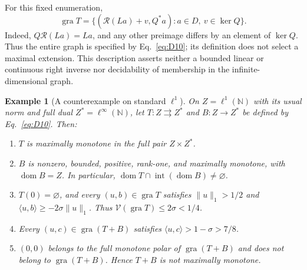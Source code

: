 \documentclass[11pt]{article}
\newcommand{\N}{\mathbb N}
\newcommand{\gra}{\operatorname{gra}}
\newcommand{\dom}{\operatorname{dom}}
\newcommand{\pair}[2]{\langle #1,#2\rangle}
\newtheorem{example}{Example}
\theoremstyle{definition}
\theoremstyle{remark}
\begin{document}
For this fixed enumeration,
\[
\gra T=\{(\mathcal R(La)+v,Q^*a):a\in D,\ v\in\ker Q\}.
\]
Indeed, $Q\mathcal R(La)=La$, and any other preimage differs by
an element of $\ker Q$. Thus the entire graph is specified by
Eq.~\eqref{eq:D10}; its definition does not select a maximal extension.
This description asserts neither a bounded linear or continuous right
inverse nor decidability of membership in the infinite-dimensional graph.

\label{sec:l1}
\begin{example}[A counterexample on standard $\ell^1$]\label{thm:L}
On $Z=\ell^1(\N)$ with its usual norm and full dual $Z^*=\ell^\infty(\N)$,
let $T:Z\rightrightarrows Z^*$ and $B:Z\to Z^*$ be defined by Eq.~\eqref{eq:D10}.
Then:
\begin{enumerate}
\item $T$ is maximally monotone in the full pair $Z\times Z^*$.
\item $B$ is nonzero, bounded, positive, rank-one, and maximally monotone,
with $\dom B=Z$. In particular,
$\dom T\cap\operatorname{int}(\dom B)\ne\varnothing$.
\item $T(0)=\varnothing$, and every $(u,b)\in\gra T$ satisfies
$\|u\|_1>1/2$ and $\pair{u}{b}\ge-2\sigma\|u\|_1$.
Thus $\mathcal V(\gra T)\le2\sigma<1/4$.
\item Every $(u,c)\in\gra(T+B)$ satisfies
$\pair{u}{c}>1-\sigma>7/8$.
\item $(0,0)$ belongs to the full monotone polar of $\gra(T+B)$ and does
not belong to $\gra(T+B)$. Hence $T+B$ is not maximally monotone.
\end{enumerate}
\end{example}
\end{document}
